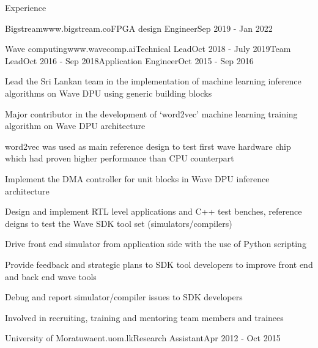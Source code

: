 \documentclass[
11pt, %
]{./../assets/resume} %
\begin{document}
\begin{rSection}{Experience}
\begin{rSubsectionX}{Bigstream}{www.bigstream.co}{FPGA design Engineer}{Sep 2019 - Jan 2022}
	\end{rSubsectionX}
	\begin{rSubsectionM}{Wave computing}{www.wavecomp.ai}{Technical Lead}{Oct 2018 - July 2019}{Team Lead}{Oct 2016 - Sep 2018}{Application Engineer}{Oct 2015 - Sep 2016}
		\item Lead the Sri Lankan team in the implementation of machine learning inference algorithms on Wave DPU using generic building blocks
		\item Major contributor in the development of `word2vec' machine learning training algorithm on Wave DPU architecture
		\item word2vec was used as main reference design to test first wave hardware chip which had proven higher performance than CPU counterpart
		\item Implement the DMA controller for unit blocks in Wave DPU inference architecture
		\item Design and implement RTL level applications and C++ test benches, reference deigns to test the Wave SDK tool set (simulators/compilers)
		\item Drive front end simulator from application side with the use of Python scripting
		\item Provide feedback and strategic plans to SDK tool developers to improve front end and back end wave tools
		\item Debug and report simulator/compiler issues to SDK developers
		\item Involved in recruiting, training and mentoring team members and trainees
	\end{rSubsectionM}
	\begin{rSubsectionSimpleX}{University of Moratuwa}{ent.uom.lk}{Research Assistant}{Apr 2012 - Oct 2015}
	\end{rSubsectionSimpleX}
	
\end{rSection}
\end{document}
